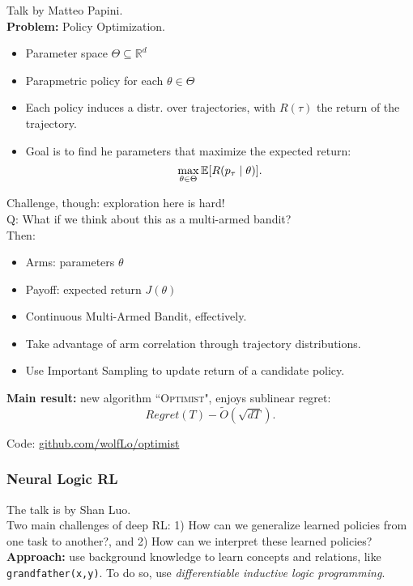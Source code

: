 Talk by Matteo Papini. \\

{\bf Problem:} Policy Optimization.
\begin{itemize}
    \item Parameter space $\Theta \subseteq \mathbb{R}^d$
    \item Parapmetric policy for each $\theta \in \Theta$
    \item Each policy induces a distr. over trajectories, with $R(\tau)$ the return of the trajectory.
    \item Goal is to find he parameters that maximize the expected return:
    \[
    \max_{\theta \in \Theta} \mathbb{E}[R(p_\tau \mid \theta)].
    \]
\end{itemize}

Challenge, though: exploration here is hard! \\

Q: What if we think about this as a multi-armed bandit? \\
Then:
\begin{itemize}
    \item Arms: parameters $\theta$
    \item Payoff: expected return $J(\theta)$
    \item Continuous Multi-Armed Bandit, effectively.
    \item Take advantage of arm correlation through trajectory distributions.
    \item Use Important Sampling to update return of a candidate policy.
\end{itemize}

{\bf Main result:} new algorithm ``\textsc{Optimist}", enjoys sublinear regret:
\[
Regret(T) - \tilde{O}(\sqrt{dT}).
\]

Code: \url{github.com/wolfLo/optimist} 

\spacerule

\subsubsection{Neural Logic RL~\cite{jiang2019neural}}

The talk is by Shan Luo. \\

Two main challenges of deep RL: 1) How can we generalize learned policies from one task to another?, and 2) How can we interpret these learned policies? \\

{\bf Approach:} use background knowledge to learn concepts and relations, like \texttt{grandfather(x,y)}. To do so, use {\it differentiable inductive logic programming}.

